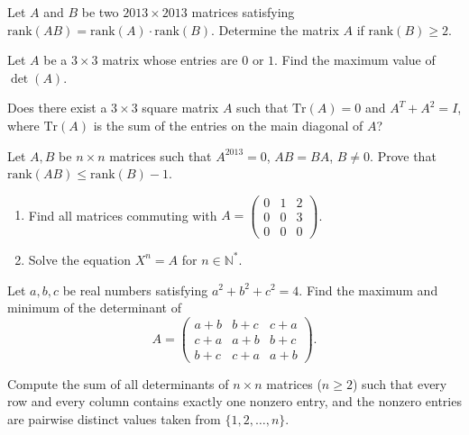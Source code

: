 \documentclass[12pt]{article}
\begin{document}
\begin{problem}
Let $A$ and $B$ be two $2013\times 2013$ matrices satisfying $\mathrm{rank}(AB)=\mathrm{rank}(A)\cdot\mathrm{rank}(B)$. Determine the matrix $A$ if $\mathrm{rank}(B)\geq 2$.
\end{problem}

\begin{problem}
Let $A$ be a $3\times 3$ matrix whose entries are $0$ or $1$. Find the maximum value of $\det(A)$.
\end{problem}

\begin{problem}
Does there exist a $3\times 3$ square matrix $A$ such that $\mathrm{Tr}(A)=0$ and $A^T+A^2=I$, where $\mathrm{Tr}(A)$ is the sum of the entries on the main diagonal of $A$?
\end{problem}

\begin{problem}
Let $A,B$ be $n\times n$ matrices such that $A^{2013}=0$, $AB=BA$, $B\neq 0$. Prove that $\mathrm{rank}(AB) \leq \mathrm{rank}(B)-1$.
\end{problem}

\begin{problem}
\begin{enumerate}[label=\arabic*.]
\item Find all matrices commuting with $A=\begin{pmatrix}0&1&2\\0&0&3\\0&0&0\end{pmatrix}$.
\item Solve the equation $X^n=A$ for $n\in\mathbb{N}^*$.
\end{enumerate}
\end{problem}

\begin{problem}
Let $a,b,c$ be real numbers satisfying $a^2+b^2+c^2=4$. Find the maximum and minimum of the determinant of
\[
A = \begin{pmatrix}
a+b & b+c & c+a\\
c+a & a+b & b+c\\
b+c & c+a & a+b
\end{pmatrix}.
\]
\end{problem}

\begin{problem}
Compute the sum of all determinants of $n\times n$ matrices ($n\geq 2$) such that every row and every column contains exactly one nonzero entry, and the nonzero entries are pairwise distinct values taken from $\{1,2,\dots,n\}$.
\end{problem}
\end{document}
